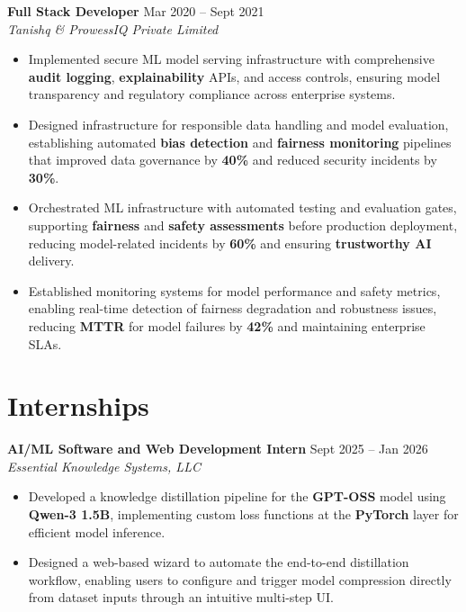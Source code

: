 \documentclass[11pt,a4paper]{article}
\newcommand{\jobentry}[3]{%
  \vspace{5pt}%
  \noindent\textbf{#1} \hfill #3\\%
  \textit{#2}%
}
\begin{document}
\jobentry{Full Stack Developer}{Tanishq \& ProwessIQ Private Limited}{Mar 2020 -- Sept 2021}
\begin{itemize}
\item Implemented secure ML model serving infrastructure with comprehensive \textbf{audit logging}, \textbf{explainability} APIs, and access controls, ensuring model transparency and regulatory compliance across enterprise systems.
\item Designed infrastructure for responsible data handling and model evaluation, establishing automated \textbf{bias detection} and \textbf{fairness monitoring} pipelines that improved data governance by \textbf{40\%} and reduced security incidents by \textbf{30\%}.
\item Orchestrated ML infrastructure with automated testing and evaluation gates, supporting \textbf{fairness} and \textbf{safety assessments} before production deployment, reducing model-related incidents by \textbf{60\%} and ensuring \textbf{trustworthy AI} delivery.
\item Established monitoring systems for model performance and safety metrics, enabling real-time detection of fairness degradation and robustness issues, reducing \textbf{MTTR} for model failures by \textbf{42\%} and maintaining enterprise SLAs.
\end{itemize}

\section*{Internships}

\jobentry{AI/ML Software and Web Development Intern}{Essential Knowledge Systems, LLC}{Sept 2025 -- Jan 2026}
\begin{itemize}
\item Developed a knowledge distillation pipeline for the \textbf{GPT-OSS} model using \textbf{Qwen-3 1.5B}, implementing custom loss functions at the \textbf{PyTorch} layer for efficient model inference.
\item Designed a web-based wizard to automate the end-to-end distillation workflow, enabling users to configure and trigger model compression directly from dataset inputs through an intuitive multi-step UI.
\end{itemize}
\end{document}
